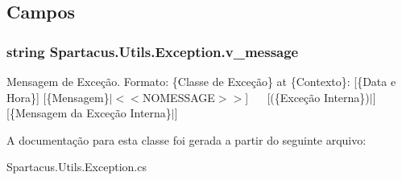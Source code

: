 \subsection{Campos}
\hypertarget{classSpartacus_1_1Utils_1_1Exception_a7fca16a29a778b1dea36109d89e8b7cd}{
\subsubsection[{v\+\_\+message}]{\setlength{\rightskip}{0pt plus 5cm}string Spartacus.\+Utils.\+Exception.\+v\+\_\+message}}\label{classSpartacus_1_1Utils_1_1Exception_a7fca16a29a778b1dea36109d89e8b7cd}


Mensagem de Exceção. Formato\+: \{Classe de Exceção\} at \{Contexto\}\+: \mbox{[}\{Data e Hora\}\mbox{]} \mbox{[}\{Mensagem\}$\vert$$<$$<$\+N\+O\+M\+E\+S\+S\+A\+G\+E$>$$>$\mbox{]}~\newline
~\newline
 \mbox{[}(\{Exceção Interna\})$\vert$\mbox{]} \mbox{[}\{Mensagem da Exceção Interna\}$\vert$\mbox{]} 



A documentação para esta classe foi gerada a partir do seguinte arquivo\+:\begin{DoxyCompactItemize}
\item 
Spartacus.\+Utils.\+Exception.\+cs\end{DoxyCompactItemize}
